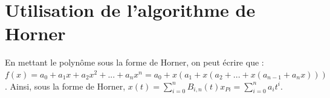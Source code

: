 \documentclass[10pt,fleqn]{article} %
\begin{document}
%
%
%
%
%


\section{Utilisation de l'algorithme de Horner}


%

\ifprof
\else
En mettant le polynôme sous la forme de Horner, on peut écrire que : 
$f(x)=a_0 + a_1 x + a_2 x^2 +...+ a_n x^n = a_0 + x\left( a_1  + x \left( a_2+ ...
+x \left(a_{n-1} +a_n x\right)\right)\right)$. Ainsi, sous la forme de Horner, $x(t)= \sum\limits_{i=0}^{n} B_{i,n}(t) x_{Pi} = \sum\limits_{i=0}^{n} a_i t^i$.
\end{document}
